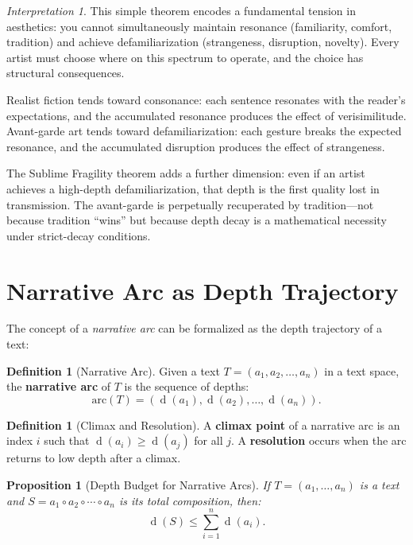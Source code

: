 \documentclass[11pt,openany]{book}
\theoremstyle{definition}
\newtheorem{definition}[axiom]{Definition}
\theoremstyle{plain}
\newtheorem{proposition}[axiom]{Proposition}
\theoremstyle{remark}
\newtheorem{interpretation}[axiom]{Interpretation}
\newcommand{\compose}{\circ}                 %
\newcommand{\depth}{\operatorname{d}}       %
\begin{document}
\begin{interpretation}
This simple theorem encodes a fundamental tension in aesthetics: you cannot simultaneously maintain resonance (familiarity, comfort, tradition) and achieve defamiliarization (strangeness, disruption, novelty). Every artist must choose where on this spectrum to operate, and the choice has structural consequences.

Realist fiction tends toward consonance: each sentence resonates with the reader's expectations, and the accumulated resonance produces the effect of verisimilitude. Avant-garde art tends toward defamiliarization: each gesture breaks the expected resonance, and the accumulated disruption produces the effect of strangeness.

The Sublime Fragility theorem adds a further dimension: even if an artist achieves a high-depth defamiliarization, that depth is the first quality lost in transmission. The avant-garde is perpetually recuperated by tradition---not because tradition ``wins'' but because depth decay is a mathematical necessity under strict-decay conditions.
\end{interpretation}

\section{Narrative Arc as Depth Trajectory}

The concept of a \emph{narrative arc} can be formalized as the depth trajectory of a text:

\begin{definition}[Narrative Arc]
Given a text $T = (a_1, a_2, \ldots, a_n)$ in a text space, the \textbf{narrative arc} of $T$ is the sequence of depths:
\[
\mathrm{arc}(T) = (\depth(a_1), \depth(a_2), \ldots, \depth(a_n)).
\]
\end{definition}

\begin{definition}[Climax and Resolution]
A \textbf{climax point} of a narrative arc is an index $i$ such that $\depth(a_i) \geq \depth(a_j)$ for all $j$. A \textbf{resolution} occurs when the arc returns to low depth after a climax.
\end{definition}

\begin{proposition}[Depth Budget for Narrative Arcs]
If $T = (a_1, \ldots, a_n)$ is a text and $S = a_1 \compose a_2 \compose \cdots \compose a_n$ is its total composition, then:
\[
\depth(S) \leq \sum_{i=1}^{n} \depth(a_i).
\]
\end{proposition}
\end{document}
